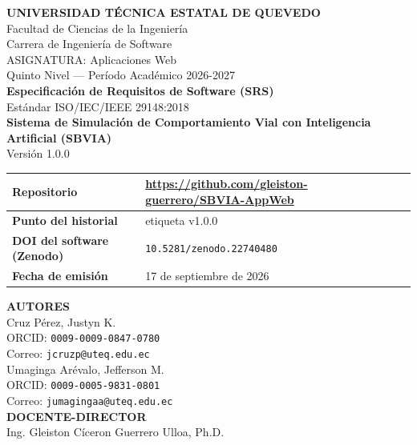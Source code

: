 \documentclass[11pt,a4paper]{article}
\begin{document}
\begin{titlepage}
    \centering
    \vspace*{1cm}
    {\LARGE \textbf{UNIVERSIDAD TÉCNICA ESTATAL DE QUEVEDO}}\\[0.5cm]
    {\large Facultad de Ciencias de la Ingeniería}\\[0.2cm]
    {\large Carrera de Ingeniería de Software}\\[0.8cm]
    
    {\large ASIGNATURA: Aplicaciones Web}\\[0.2cm]
    {\large Quinto Nivel — Período Académico 2026-2027}\\[1cm]
    
    {\Huge \bfseries Especificación de Requisitos de Software (SRS)}\\[0.5cm]
    {\large Estándar ISO/IEC/IEEE 29148:2018}\\[1cm]
    
    {\huge \bfseries \color{uteqblue} Sistema de Simulación de Comportamiento Vial con Inteligencia Artificial (SBVIA)}\\[0.5cm]
    {\Large Versión 1.0.0}\\[1cm]
    
    \begin{table}[h]
        \centering
        \renewcommand{\arraystretch}{1.5}
        \begin{tabularx}{\textwidth}{|l|X|}
            \hline
            \textbf{Repositorio} & \url{https://github.com/gleiston-guerrero/SBVIA-AppWeb} \\ \hline
            \textbf{Punto del historial} & etiqueta v1.0.0 \\ \hline
            \textbf{DOI del software (Zenodo)} & \texttt{10.5281/zenodo.22740480} \\ \hline
            \textbf{Fecha de emisión} & 17 de septiembre de 2026 \\ \hline
        \end{tabularx}
    \end{table}

    \vfill

    {\Large \textbf{AUTORES}}\\[0.2cm]
    {\large Cruz Pérez, Justyn K.}\\[0.1cm]
    {\normalsize ORCID: \texttt{0009-0009-0847-0780}}\\[0.1cm]
    {\normalsize Correo: \texttt{jcruzp@uteq.edu.ec}}\\[0.5cm]

    {\large Umaginga Arévalo, Jefferson M.}\\[0.1cm]
    {\normalsize ORCID: \texttt{0009-0005-9831-0801}}\\[0.1cm]
    {\normalsize Correo: \texttt{jumagingaa@uteq.edu.ec}}\\[0.5cm]

    {\Large \textbf{DOCENTE-DIRECTOR}}\\[0.2cm]
    {\large Ing. Gleiston Cíceron Guerrero Ulloa, Ph.D.}\\[0.5cm]
    
\end{titlepage}
\end{document}
